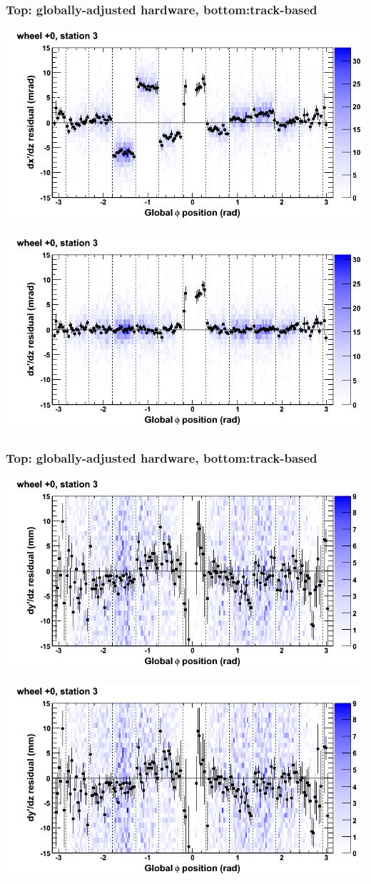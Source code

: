 \documentclass[compress]{beamer}
\begin{document}
\begin{frame}
\frametitle{Top: globally-adjusted hardware, bottom:track-based}
\includegraphics[width=0.7\linewidth]{NOV4_mapplots_HW/DTvsphi_st3whC_dxdz.png}

\includegraphics[width=0.7\linewidth]{NOV4_mapplots/DTvsphi_st3whC_dxdz.png}
\end{frame}

\begin{frame}
\frametitle{Top: globally-adjusted hardware, bottom:track-based}
\includegraphics[width=0.7\linewidth]{NOV4_mapplots_HW/DTvsphi_st3whC_dydz.png}

\includegraphics[width=0.7\linewidth]{NOV4_mapplots/DTvsphi_st3whC_dydz.png}
\end{frame}
\end{document}
